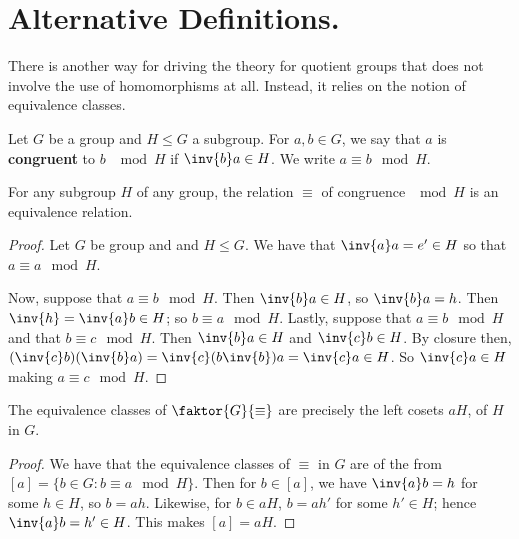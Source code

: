 
\section{Alternative Definitions.}
\label{section1}

There is another way for driving the theory for quotient groups that does not
involve the use of homomorphisms at all. Instead, it relies on the notion of
equivalence classes.

\begin{definition}
    Let $G$ be a group and  $H \leq G$ a subgroup. For $a,b \in G$, we say that
     $a$ is  \textbf{congruent} to $b$  $\mod{H}$ if $\inv{b}a \in H$. We write
     $a \equiv b \mod{H}$.
\end{definition}

\begin{lemma}\label{3.2.1}
    For any subgroup $H$ of any group, the relation  $\equiv$ of congruence
    $\mod{H}$ is an equivalence relation.
\end{lemma}
\begin{proof}
    Let $G$ be group and and  $H \leq G$. We have that  $\inv{a}a = e' \in H$ so
    that $a \equiv a \mod{H}$.

    Now, suppose that $a \equiv b \mod{H}$. Then $\inv{b}a \in H$, so
    $\inv{b}a=h$. Then $\inv{h}=\inv{a}b \in H$; so $b \equiv a \mod{H}$.
    Lastly, suppose that $a \equiv b \mod{H}$ and that $b \equiv c \mod{H}$.
    Then  $\inv{b}a \in H$ and $\inv{c}b \in H$. By closure then,
    $(\inv{c}b)(\inv{b}a)=\inv{c}(b\inv{b})a=\inv{c}a \in H$. So $\inv{c}a \in
    H$ making $a \equiv c \mod{H}$.
\end{proof}
\begin{corollary}
    The equivalence classes of $\faktor{G}{\equiv}$ are precisely the left
    cosets $aH$, of $H$ in  $G$.
\end{corollary}
\begin{proof}
    We have that the equivalence classes of $\equiv$ in  $G$ are of the from
    $[a]=\{b \in G : b \equiv a \mod{H}\}$. Then for $b \in [a]$, we have
    $\inv{a}b=h$ for some $h \in H$, so  $b=ah$. Likewise, for  $b \in aH$,
    $b=ah'$ for some $h' \in H$; hence  $\inv{a}b =h' \in H$. This makes
    $[a]=aH$.
\end{proof}

